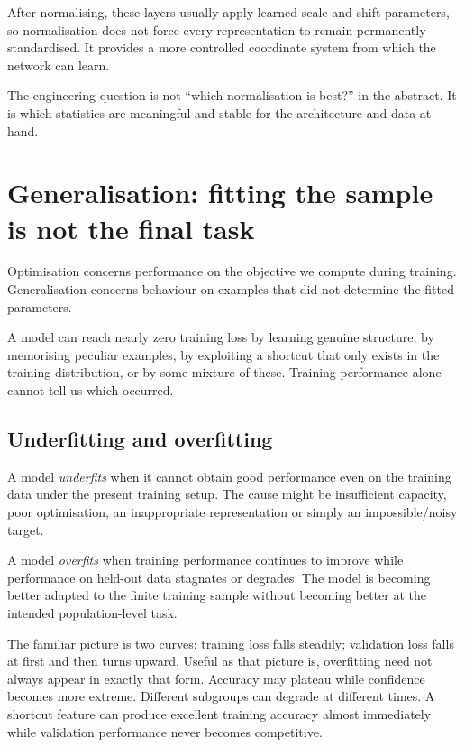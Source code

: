 After normalising, these layers usually apply learned scale and shift parameters, so normalisation does not force every representation to remain permanently standardised. It provides a more controlled coordinate system from which the network can learn.

The engineering question is not ``which normalisation is best?'' in the abstract. It is which statistics are meaningful and stable for the architecture and data at hand.

\section{Generalisation: fitting the sample is not the final task}

Optimisation concerns performance on the objective we compute during training. Generalisation concerns behaviour on examples that did not determine the fitted parameters.

A model can reach nearly zero training loss by learning genuine structure, by memorising peculiar examples, by exploiting a shortcut that only exists in the training distribution, or by some mixture of these. Training performance alone cannot tell us which occurred.

\subsection{Underfitting and overfitting}

A model \emph{underfits} when it cannot obtain good performance even on the training data under the present training setup. The cause might be insufficient capacity, poor optimisation, an inappropriate representation or simply an impossible/noisy target.

A model \emph{overfits} when training performance continues to improve while performance on held-out data stagnates or degrades. The model is becoming better adapted to the finite training sample without becoming better at the intended population-level task.

The familiar picture is two curves: training loss falls steadily; validation loss falls at first and then turns upward. Useful as that picture is, overfitting need not always appear in exactly that form. Accuracy may plateau while confidence becomes more extreme. Different subgroups can degrade at different times. A shortcut feature can produce excellent training accuracy almost immediately while validation performance never becomes competitive.

